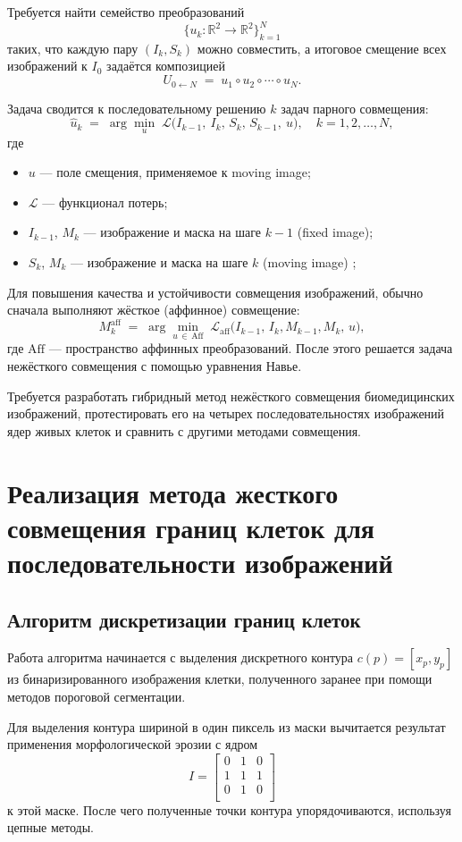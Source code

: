 \documentclass[12pt]{article}
\begin{document}
Требуется найти семейство преобразований
\[
\{u_k\colon \mathbb{R}^2 \to \mathbb{R}^2\}_{k=1}^N
\]
таких, что каждую пару $(I_{k}, S_k)$ можно совместить, а итоговое смещение всех изображений к $I_0$ задаётся композицией
\[
U_{0\leftarrow N} \;=\; u_1 \circ u_2 \circ \cdots \circ u_N.
\]

Задача сводится к последовательному решению $k$ задач парного совмещения:
\[
\hat u_k \;=\;\arg\min_{u}\; \mathcal{L}\bigl(I_{k-1},\ I_{k},\, S_k,\, S_{k-1},\ u\bigr),
\quad k = 1,2,\dots,N,
\]
где
\begin{itemize}
  \item $u$ — поле смещения, применяемое к moving image;
  \item $\mathcal{L}$ — функционал потерь;
  \item $I_{k-1}$, $M_{k}$ — изображение и маска на шаге $k-1$ (fixed image);
  \item $S_{k}$, $M_k$ — изображение и маска на шаге $k$ (moving image) ;
\end{itemize}

Для повышения качества и устойчивости совмещения изображений, обычно сначала выполняют жёсткое (аффинное) совмещение:
\[
M_k^{\mathrm{aff}}\;=\;\arg\min_{u\,\in\,\mathrm{Aff}}\;
\mathcal{L}_{\mathrm{aff}}\bigl(I_{k-1},\, I_{k}, M_{k-1}, M_{k},\, u\bigr),
\]
где $\mathrm{Aff}$ — пространство аффинных преобразований. После этого решается задача нежёсткого совмещения с помощью уравнения Навье.

Требуется разработать гибридный метод нежёсткого совмещения биомедицинских изображений, протестировать его на четырех последовательностях изображений ядер живых клеток и сравнить с другими методами совмещения.



\section{Реализация метода жесткого совмещения границ клеток для последовательности изображений}

\subsection{Алгоритм дискретизации границ клеток}

Работа алгоритма начинается с выделения дискретного контура $c(p) = [x_p, y_p]$ из бинаризированного изображения клетки, полученного заранее при помощи методов
пороговой сегментации.  

Для выделения контура шириной в один пиксель из маски вычитается результат применения морфологической эрозии с ядром $$I = \begin{bmatrix}
    0 & 1 & 0 \\
    1 & 1 & 1 \\
    0 & 1 & 0 \\
    \end{bmatrix}$$ к этой маске.
После чего полученные точки контура упорядочиваются, используя цепные методы.\cite{annapurna2013} 
\end{document}
